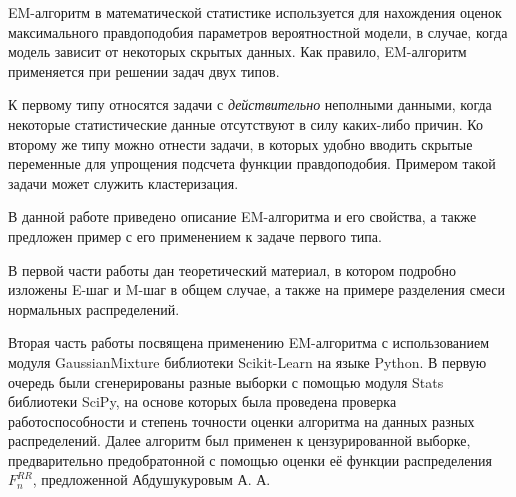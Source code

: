 EM-алгоритм в математической статистике используется для нахождения оценок максимального правдоподобия параметров вероятностной модели, в случае, когда модель зависит от некоторых скрытых данных. Как правило, EM-алгоритм применяется при решении задач двух типов.

К первому типу относятся задачи с \emph{действительно} неполными данными, когда некоторые статистические данные отсутствуют в силу каких-либо причин. Ко второму же типу можно отнести задачи, в которых удобно вводить скрытые переменные для упрощения подсчета функции правдоподобия. Примером такой задачи может служить кластеризация.

В данной работе приведено описание EM-алгоритма и его свойства, а также предложен пример с его применением к задаче первого типа.

В первой части работы дан теоретический материал, в котором подробно изложены E-шаг и M-шаг в общем случае, а также на примере разделения смеси нормальных распределений.

Вторая часть работы посвящена применению EM-алгоритма с использованием модуля GaussianMixture библиотеки Scikit-Learn на языке Python. В первую очередь были сгенерированы разные выборки с помощью модуля Stats библиотеки SciPy, на основе которых была проведена проверка работоспособности и степень точности оценки алгоритма на данных разных распределений. Далее алгоритм был применен к цензурированной выборке, предварительно предобратонной с помощью оценки её функции распределения $F_n^{RR}$, предложенной Абдушукуровым А. А.